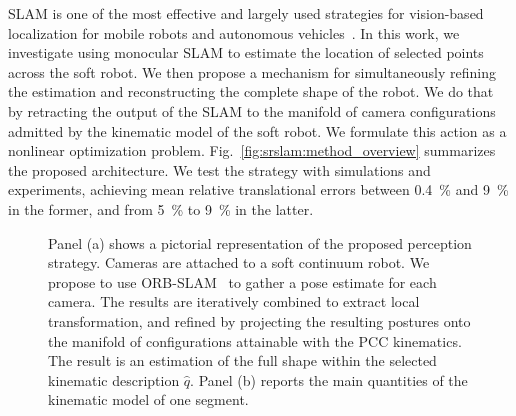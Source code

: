 \gls{SLAM} is one of the most effective and largely used strategies for vision-based localization for mobile robots and autonomous vehicles~\cite{fuentes2015visual,mur2017orb}. %
%
In this work, we investigate using monocular \gls{SLAM} to estimate the location of selected points across the soft robot. We then propose a mechanism for simultaneously refining the estimation and reconstructing the complete shape of the robot. We do that by retracting the output of the \gls{SLAM} to the manifold of camera configurations admitted by the kinematic model of the soft robot. We formulate this action as a nonlinear optimization problem. Fig.~\ref{fig:srslam:method_overview} summarizes the proposed architecture. We test the strategy with simulations and experiments, achieving mean relative translational errors between \SI{0.4}{\percent} and \SI{9}{\percent} in the former, and from \SI{5}{\percent} to \SI{9}{\percent} in the latter.

\begin{figure}[ht]
     \centering
     \caption{\small Panel (a) shows a pictorial representation of the proposed perception strategy. Cameras are attached to a soft continuum robot. We propose to use ORB-SLAM~\cite{mur2017orb} to gather a pose estimate for each camera. The results are iteratively combined to extract local transformation, and refined by projecting the resulting postures onto the manifold of configurations attainable with the \gls{PCC} kinematics. The result is an estimation of the full shape within the selected kinematic description $\hat{q}$. Panel (b) reports the main quantities of the kinematic model of one segment. }
\end{figure}